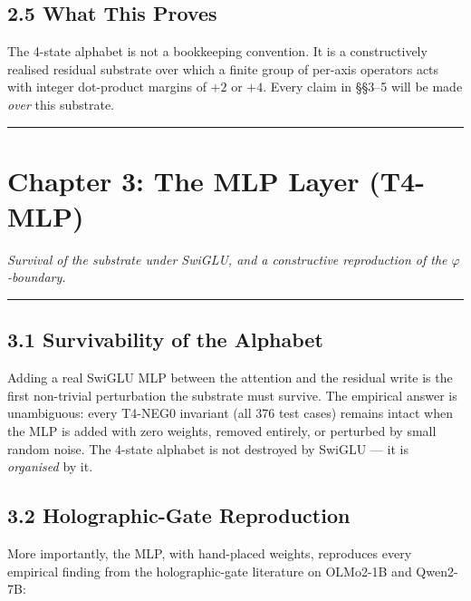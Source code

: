 \documentclass[
  twocolumn,
  10pt,
  a4paper]{article}
\begin{document}
\hypertarget{what-this-proves}{%
\subsection{2.5 What This Proves}\label{what-this-proves}}

The 4-state alphabet is not a bookkeeping convention. It is a
constructively realised residual substrate over which a finite group of
per-axis operators acts with integer dot-product margins of \(+2\) or
\(+4\). Every claim in §§3--5 will be made \emph{over} this substrate.

\begin{center}\rule{0.5\linewidth}{0.5pt}\end{center}

\hypertarget{chapter-3-the-mlp-layer-t4-mlp}{%
\FloatBarrier
\section{Chapter 3: The MLP Layer
(T4-MLP)}\label{chapter-3-the-mlp-layer-t4-mlp}}

\emph{Survival of the substrate under SwiGLU, and a constructive
reproduction of the \(\varphi\)-boundary.}

\begin{center}\rule{0.5\linewidth}{0.5pt}\end{center}

\hypertarget{survivability-of-the-alphabet}{%
\subsection{3.1 Survivability of the
Alphabet}\label{survivability-of-the-alphabet}}

Adding a real SwiGLU MLP between the attention and the residual write is
the first non-trivial perturbation the substrate must survive. The
empirical answer is unambiguous: every T4-NEG0 invariant (all 376 test
cases) remains intact when the MLP is added with zero weights, removed
entirely, or perturbed by small random noise. The 4-state alphabet is
not destroyed by SwiGLU --- it is \emph{organised} by it.

\hypertarget{holographic-gate-reproduction}{%
\subsection{3.2 Holographic-Gate
Reproduction}\label{holographic-gate-reproduction}}

More importantly, the MLP, with hand-placed weights, reproduces every
empirical finding from the holographic-gate literature on OLMo2-1B and
Qwen2-7B:
\end{document}
